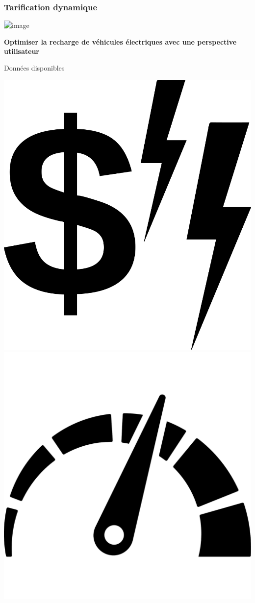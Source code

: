 \documentclass[french]{beamer}
\begin{document}
{\begin{frame}
\begin{columns}[T]
\begin{column}[T]{0.5\linewidth}  %
\begin{overlayarea}{0.95\linewidth}{2.8in}
\end{overlayarea}
\end{column}
\end{columns}
\end{frame}


\begin{frame}
\begin{center}
\frametitle{Tarification dynamique}
\includegraphics<1>[width=\linewidth]{hydroquebec.jpg}
\end{center}
\end{frame}

\begin{frame}
\begin{center}
\huge \textbf{Optimiser la recharge de véhicules électriques avec une perspective utilisateur}
\end{center}
\end{frame}


\begin{frame}{Données disponibles}
\begin{center}
\includegraphics[width=0.25\linewidth]{dollarelectricity}\hspace{0.2\linewidth}
\includegraphics[width=0.25\linewidth]{cadran}


\end{center}
\end{frame}}
\end{document}
